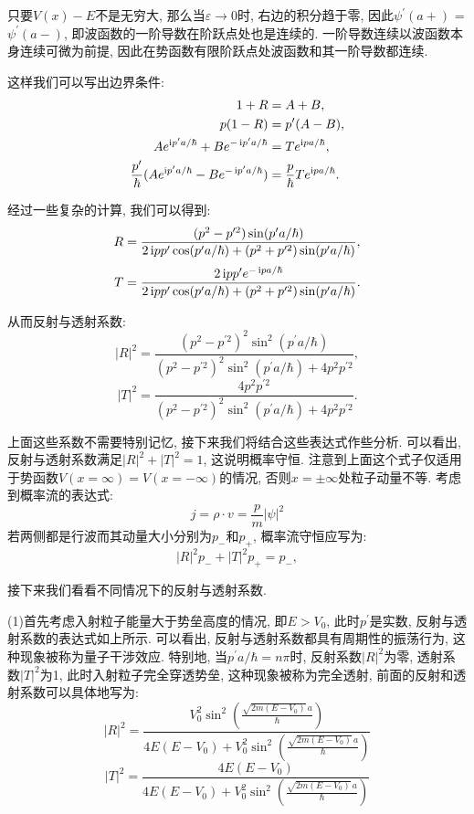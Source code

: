 只要$V(x)-E$不是无穷大, 那么当$\varepsilon \to 0$时, 右边的积分趋于零, 因此$\psi^{\prime}(a+)$ = $\psi^{\prime}(a-)$, 即波函数的一阶导数在阶跃点处也是连续的. 一阶导数连续以波函数本身连续可微为前提, 因此在势函数有限阶跃点处波函数和其一阶导数都连续.

这样我们可以写出边界条件:
\[
\begin{aligned}
  1+R &= A+B, \\
  p(1-R) &= p^{\prime}(A-B), \\
  Ae^{\mathop{}\!\mathrm{i} p^{\prime}a/\hbar} + Be^{-\mathop{}\!\mathrm{i} p^{\prime}a/\hbar} &= Te^{\mathop{}\!\mathrm{i} pa/\hbar}, \\
  \frac{p^{\prime}}{\hbar}(Ae^{\mathop{}\!\mathrm{i} p^{\prime}a/\hbar} - Be^{-\mathop{}\!\mathrm{i} p^{\prime}a/\hbar}) &= \frac{p}{\hbar}Te^{\mathop{}\!\mathrm{i} pa/\hbar}.
\end{aligned}
\]

经过一些复杂的计算, 我们可以得到:
\[
R = \frac{(p^2-p^{\prime 2})\sin(p^{\prime}a/\hbar)}{2\mathop{}\!\mathrm{i} pp^{\prime}\cos(p^{\prime}a/\hbar) + (p^2+p^{\prime 2})\sin(p^{\prime}a/\hbar)},
\]
\[
T = \frac{2\mathop{}\!\mathrm{i} pp^{\prime}e^{-\mathop{}\!\mathrm{i} pa/\hbar}}{2\mathop{}\!\mathrm{i} pp^{\prime}\cos(p^{\prime}a/\hbar) + (p^2+p^{\prime 2})\sin(p^{\prime}a/\hbar)}.
\]

从而反射与透射系数:
\[
|R|^2 = \frac{(p^2-p^{\prime 2})^2\sin^2(p^{\prime}a/\hbar)}{(p^2-p^{\prime 2})^2\sin^2(p^{\prime}a/\hbar) + 4p^2p^{\prime 2}},
\]
\[
|T|^2 = \frac{4p^2p^{\prime 2}}{(p^2-p^{\prime 2})^2\sin^2(p^{\prime}a/\hbar) + 4p^2p^{\prime 2}}.
\]

上面这些系数不需要特别记忆, 接下来我们将结合这些表达式作些分析. 可以看出, 反射与透射系数满足$|R|^2 + |T|^2 = 1$, 这说明概率守恒. 注意到上面这个式子仅适用于势函数$V(x=\infty)=V(x=-\infty)$的情况, 否则$x=\pm\infty$处粒子动量不等. 考虑到概率流的表达式:
\[
j = \rho \cdot v = \frac{p}{m}|\psi|^2
\]
若两侧都是行波而其动量大小分别为$p_-$和$p_+$, 概率流守恒应写为:
\[
|R|^2 p_{-} + |T|^2 p_{+} = p_{-},
\]

接下来我们看看不同情况下的反射与透射系数.

(1)首先考虑入射粒子能量大于势垒高度的情况, 即$E > V_0$, 此时$p^{\prime}$是实数, 反射与透射系数的表达式如上所示. 可以看出, 反射与透射系数都具有周期性的振荡行为, 这种现象被称为量子干涉效应. 特别地, 当$p^{\prime}a/\hbar = n\pi$时, 反射系数$|R|^2$为零, 透射系数$|T|^2$为1, 此时入射粒子完全穿透势垒, 这种现象被称为完全透射, 前面的反射和透射系数可以具体地写为:
\[
|R|^2 = \frac{V_0^2\sin^2(\frac{\sqrt{2m(E-V_0)}\,a}{\hbar})}{4E(E-V_0) + V_0^2\sin^2(\frac{\sqrt{2m(E-V_0)}\,a}{\hbar})}
\]
\[
|T|^2 = \frac{4E(E-V_0)}{4E(E-V_0) + V_0^2\sin^2(\frac{\sqrt{2m(E-V_0)}\,a}{\hbar})}
\]

